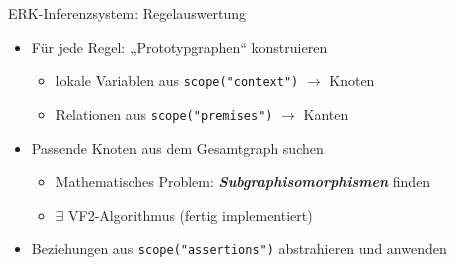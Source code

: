 \documentclass[
	ngerman,
	10pt,				%
	aspectratio=169 	%
]{beamer}
\newcommand\py\lstinline
\begin{document}
\begin{frame}[fragile,label=erk7]{\large ERK-Inferenzsystem: Regelauswertung}

\begin{itemize}
 \item Für jede Regel: „Prototypgraphen“ konstruieren
 \begin{itemize}
  \item lokale Variablen aus \py{scope("context")} $\rightarrow$ Knoten
  \item Relationen aus \py{scope("premises")} $\rightarrow$ Kanten
 \end{itemize}
 
 \pause
 \bigskip
 \item Passende Knoten aus dem Gesamtgraph suchen
 \begin{itemize}
  \item Mathematisches Problem: \textbf{\textit{Subgraphisomorphismen}} finden
  \item $\exists$ VF2-Algorithmus (fertig implementiert)
 \end{itemize}
 
 \pause
 \bigskip
 \item Beziehungen aus \py|scope("assertions")| abstrahieren und anwenden


\end{itemize}



\end{frame}
  
\end{document}
